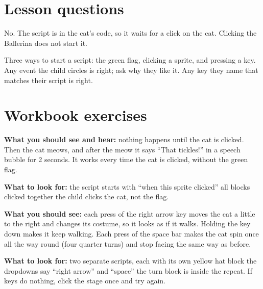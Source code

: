 
\section{Lesson questions}
\begin{answer}
No. The script is in the cat's code, so it waits for a click on the cat. Clicking the Ballerina does not start it.
\end{answer}

\begin{answer}[Reflection]
Three ways to start a script: the green flag, clicking a sprite, and pressing a key. Any event the child circles is right; ask why they like it. Any key they name that matches their script is right.
\end{answer}

\section{Workbook exercises}
\begin{answer}
\textbf{What you should see and hear:} nothing happens until the cat is clicked. Then the cat meows, and after the meow it says \enquote{That tickles!} in a speech bubble for 2 seconds. It works every time the cat is clicked, without the green flag.

\textbf{What to look for:} \tickbox{} the script starts with \enquote{when this sprite clicked} \quad \tickbox{} all blocks clicked together \quad \tickbox{} the child clicks the cat, not the flag.
\end{answer}

\begin{answer}
\textbf{What you should see:} each press of the right arrow key moves the cat a little to the right and changes its costume, so it looks as if it walks. Holding the key down makes it keep walking. Each press of the space bar makes the cat spin once all the way round (four quarter turns) and stop facing the same way as before.

\textbf{What to look for:} \tickbox{} two separate scripts, each with its own yellow hat block \quad \tickbox{} the dropdowns say \enquote{right arrow} and \enquote{space} \quad \tickbox{} the turn block is inside the repeat. If keys do nothing, click the stage once and try again.
\end{answer}

